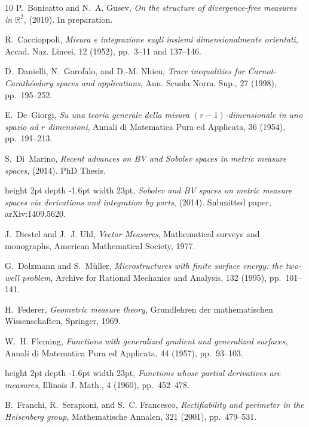 \documentclass[reqno]{amsart}
\numberwithin{equation}{section}
\newcommand{\1}{\mathbbm 1}
\begin{document}
\begin{thebibliography}{10}
{\sc P.~Bonicatto and N.~A. Gusev}, {\em On the structure of divergence-free
  measures in $\mathbb{R}^2$},  (2019).
\newblock In preparation.

{\sc R.~Caccioppoli}, {\em Misura e integrazione sugli insiemi dimensionalmente
  orientati}, Accad. Naz. Lincei, 12 (1952), pp.~3--11 and 137--146.

{\sc D.~Danielli, N.~Garofalo, and D.-M. Nhieu}, {\em Trace inequalities for
  {C}arnot-{C}arath\'eodory spaces and applications}, Ann. Scuola Norm. Sup.,
  27 (1998), pp.~195--252.

{\sc E.~De~Giorgi}, {\em Su una teoria generale della misura
  $(r-1)$-dimensionale in uno spazio ad $r$ dimensioni}, Annali di Matematica
  Pura ed Applicata, 36 (1954), pp.~191--213.

{\sc S.~Di~Marino}, {\em Recent advances on {B}{V} and {S}obolev spaces in
  metric measure spaces},  (2014).
\newblock PhD Thesis.

\leavevmode\vrule height 2pt depth -1.6pt width 23pt, {\em Sobolev and {B}{V}
  spaces on metric measure spaces via derivations and integration by parts},
  (2014).
\newblock Submitted paper, arXiv:1409.5620.

{\sc J.~Diestel and J.~J. Uhl}, {\em Vector {M}easures}, Mathematical surveys
  and monographs, American Mathematical Society, 1977.

{\sc G.~Dolzmann and S.~M{\"u}ller}, {\em Microstructures with finite surface
  energy: the two-well problem}, Archive for Rational Mechanics and Analysis,
  132 (1995), pp.~101--141.

{\sc H.~Federer}, {\em Geometric measure theory}, Grundlehren der
  mathematischen Wissenschaften, Springer, 1969.

{\sc W.~H. Fleming}, {\em Functions with generalized gradient and generalized
  surfaces}, Annali di Matematica Pura ed Applicata, 44 (1957), pp.~93--103.

\leavevmode\vrule height 2pt depth -1.6pt width 23pt, {\em Functions whose
  partial derivatives are measures}, Illinois J. Math., 4 (1960), pp.~452--478.

{\sc B.~Franchi, R.~Serapioni, and S.~C. Francesco}, {\em Rectifiability and
  perimeter in the {H}eisenberg group}, Mathematische Annalen, 321 (2001),
  pp.~479--531.


\end{thebibliography}
\end{document}
